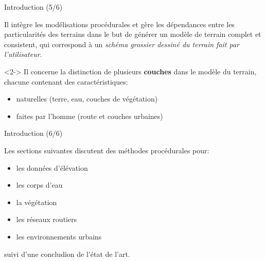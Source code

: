 \documentclass{beamer}
\begin{document}
\begin{frame}{Introduction (5/6)}

Il intègre les modélisations procédurales et gère les dépendances entre les particularités des terrains dans le but de générer un modèle de terrain complet et consistent, qui correspond à un \textit{schéma grossier dessiné du terrain fait par l'utilisateur}.\newline

\begin{uncoverenv}<2->
Il concerne la distinction de plusieurs \textbf{couches} dans le modèle du terrain, chacune contenant des caractéristiques:
\begin{itemize}
	\item naturelles (terre, eau, couches de végétation)
	\item faites par l'homme (route et couches urbaines)
\end{itemize}
\end{uncoverenv}

\newline

\newline

\end{frame}

\begin{frame}{Introduction (6/6)}

Les sections suivantes discutent des méthodes procédurales pour:
\begin{itemize}
	\item[1] les données d'élévation
	\item[2] les corps d'eau
	\item[3] la végétation
	\item[4] les réseaux routiers
	\item[5] les environnements urbains
\end{itemize} 
suivi d'une concludion de l'état de l'art.

\end{frame}
\end{document}
